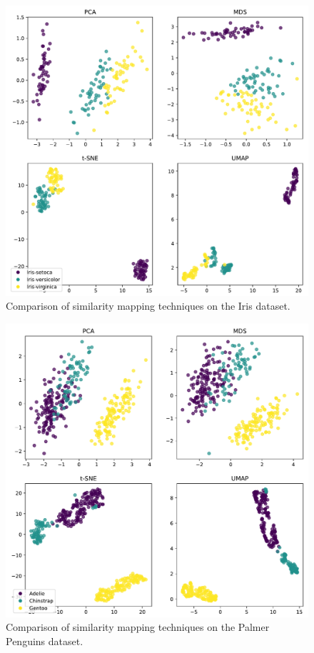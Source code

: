 \begin{figure}[tp]
\centering
\includegraphics[frame,keepaspectratio,width=\linewidth,height=\halfh]
{diagrams/iris.pdf}

\caption[Similarity Mapping on Iris dataset]
{
  Comparison of similarity mapping techniques on the Iris dataset.
}
\label{fig:IrisDataset}
\end{figure}


\begin{figure}[tp]
\centering
\includegraphics[frame,keepaspectratio,width=\linewidth,height=\halfh]
{diagrams/penguins.pdf}

\caption[Similarity Mapping on Palmer Penguins dataset]
{
  Comparison of similarity mapping techniques on the Palmer Penguins
  dataset.
}
\label{fig:PenguinDataset}
\end{figure}


